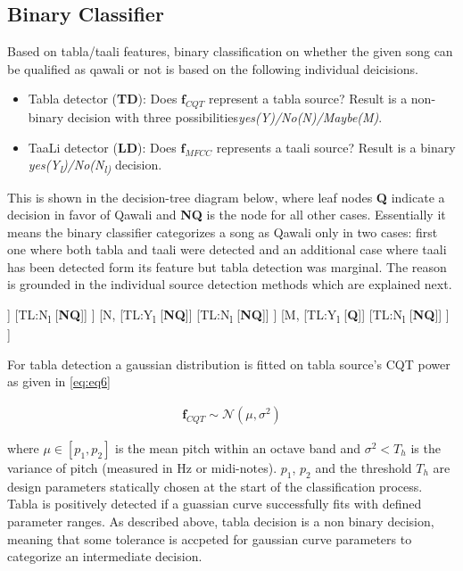\documentclass{article}
\begin{document}
\subsection{Binary Classifier}
Based on tabla/taali features, binary classification on whether the given song can be qualified as qawali or not is based on the following individual deicisions.
\begin{itemize}
	\item Tabla detector (\textbf{TD}): Does $\boldsymbol{f}_{CQT}$ represent a tabla source? Result is a non-binary decision with three possibilities\textit{yes(Y)/No(N)/Maybe(M)}.
	\item TaaLi detector (\textbf{LD}): Does $\boldsymbol{f}_{MFCC}$ represents a taali source? Result is a binary \textit{yes(Y\textsubscript{l})/No(N\textsubscript{l)}} decision.
\end{itemize}
This is shown in the decision-tree diagram below, where leaf nodes \textbf{Q} indicate a decision in favor of Qawali and \textbf{NQ} is the node for all other cases. Essentially it means the binary classifier categorizes a song as Qawali only in two cases: first one where both tabla and taali were detected and an additional case where taali has been detected form its feature but tabla detection was marginal. The reason is grounded in the individual source detection methods which are explained next.

\begin{forest}
[TD,
	[Y,
		[TL:Y\textsubscript{l}
			[\textbf{Q}]]
		[TL:N\textsubscript{l}
			[\textbf{NQ}]]
	]
	[N,
		[TL:Y\textsubscript{l}
			[\textbf{NQ}]]
		[TL:N\textsubscript{l}
			[\textbf{NQ}]]
	]
	[M,
		[TL:Y\textsubscript{l}
			[\textbf{Q}]]
		[TL:N\textsubscript{l}
			[\textbf{NQ}]]
	]
]
\end{forest}

For tabla detection a gaussian distribution is fitted on tabla source's CQT power as given in \ref{eq:eq6}

\begin{align}\label{eq:eq8}
\boldsymbol{f}_{CQT} \sim \mathcal{N}(\mu, \sigma^{2})
\end{align}

where $\mu \in [p_{1}, p_{2}]$ is the mean pitch within an octave band and $\sigma^{2} < T_{h}$ is the variance of pitch (measured in Hz or midi-notes). $p_{1}$, $p_{2}$ and the threshold $T_{h}$ are design parameters statically chosen at the start of the classification process. Tabla is positively detected if a guassian curve successfully fits with defined parameter ranges. As described above, tabla decision is a non binary decision, meaning that some tolerance is accpeted for gaussian curve parameters to categorize an intermediate decision.
\end{document}
